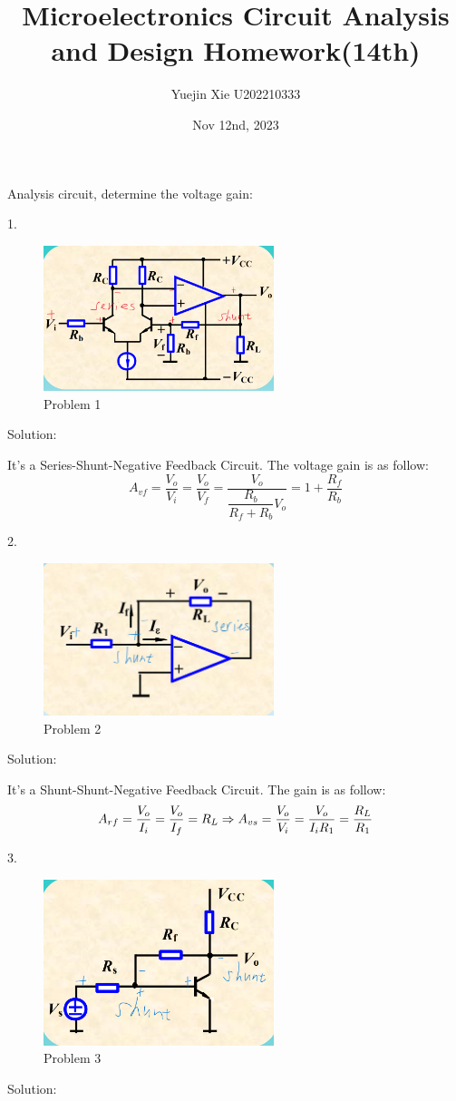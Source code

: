 \documentclass[a4paper,11pt,UTF8]{article}
\title{Microelectronics Circuit Analysis and Design Homework(14th)}
\author{Yuejin Xie \quad U202210333}
\date{Nov 12nd, 2023}
\begin{document}
\maketitle
Analysis circuit, determine the voltage gain:

1.
\begin{figure}[H]
	\centering
	\includegraphics[width=0.6\textwidth]{12.3}
	\caption{Problem 1}
\end{figure}
\noindent Solution:

It's a Series-Shunt-Negative Feedback Circuit. The voltage gain is as follow:
$$
	A_{vf}=\frac{V_o}{V_i}=\frac{V_o}{V_f}=\frac{V_o}{\dfrac{R_b}{R_f+R_b}V_o}=1+\frac{R_f}{R_b}
$$

2.
\begin{figure}[H]
	\centering
	\includegraphics[width=0.6\textwidth]{12.4}
	\caption{Problem 2}
\end{figure}
\noindent Solution:

It's a Shunt-Shunt-Negative Feedback Circuit. The gain is as follow:
$$
	A_{rf}=\frac{V_o}{I_i}=\frac{V_o}{I_f}=R_L\newline
	\Rightarrow A_{vs}=\frac{V_o}{V_i}=\frac{V_o}{I_iR_1}=\frac{R_L}{R_1}
$$

3.
\begin{figure}[H]
	\centering
	\includegraphics[width=0.6\textwidth]{12.5}
	\caption{Problem 3}
\end{figure}
\noindent Solution:
\end{document}
